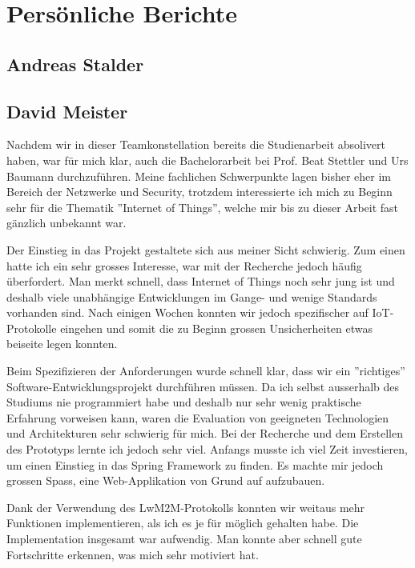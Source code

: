 \chapter{Persönliche Berichte}

\section{Andreas Stalder}














\section{David Meister}
Nachdem wir in dieser Teamkonstellation bereits die Studienarbeit absolivert haben, war für mich klar, auch die Bachelorarbeit bei Prof. Beat Stettler und Urs Baumann durchzuführen. Meine fachlichen Schwerpunkte lagen bisher eher im Bereich der Netzwerke und Security, trotzdem interessierte ich mich zu Beginn sehr für die Thematik ''Internet of Things'', welche mir bis zu dieser Arbeit fast gänzlich unbekannt war.

Der Einstieg in das Projekt gestaltete sich aus meiner Sicht schwierig. Zum einen hatte ich ein sehr grosses Interesse, war mit der Recherche jedoch häufig überfordert. Man merkt schnell, dass Internet of Things noch sehr jung ist und deshalb viele unabhängige Entwicklungen im Gange- und wenige Standards vorhanden sind. Nach einigen Wochen konnten wir jedoch spezifischer auf IoT-Protokolle eingehen und somit die zu Beginn grossen Unsicherheiten etwas beiseite legen konnten.

Beim Spezifizieren der Anforderungen wurde schnell klar, dass wir ein ''richtiges'' Software-Entwicklungsprojekt durchführen müssen. Da ich selbst ausserhalb des Studiums nie programmiert habe und deshalb nur sehr wenig praktische Erfahrung vorweisen kann, waren die Evaluation von geeigneten Technologien und Architekturen sehr schwierig für mich. Bei der Recherche und dem Erstellen des Prototyps lernte ich jedoch sehr viel. Anfangs musste ich viel Zeit investieren, um einen Einstieg in das Spring Framework zu finden. Es machte mir jedoch grossen Spass, eine Web-Applikation von Grund auf aufzubauen.

Dank der Verwendung des LwM2M-Protokolls konnten wir weitaus mehr Funktionen implementieren, als ich es je für möglich gehalten habe. Die Implementation insgesamt war aufwendig. Man konnte aber schnell gute Fortschritte erkennen, was mich sehr motiviert hat.

